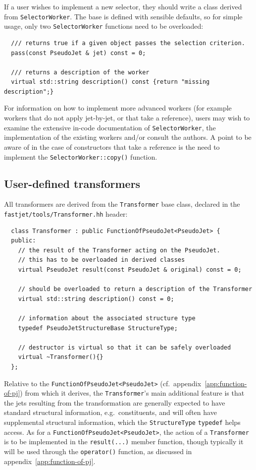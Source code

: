 \documentclass[12pt,a4]{article}
\newcommand{\ttt}[1]{{\small\texttt{#1}}}
\begin{document}
If a user wishes to implement a new selector, they should write a
class derived from \ttt{SelectorWorker}.
%
The base is defined with sensible defaults, so for simple usage, only
two \ttt{SelectorWorker} functions need to be overloaded:
\begin{lstlisting}
  /// returns true if a given object passes the selection criterion.
  pass(const PseudoJet & jet) const = 0;

  /// returns a description of the worker
  virtual std::string description() const {return "missing description";}
\end{lstlisting}
For information on how to implement more advanced workers (for example
workers that do not apply jet-by-jet, or that take a reference), users
may wish to examine the extensive in-code documentation of
\ttt{SelectorWorker}, the implementation of the existing workers
and/or consult the authors.
%
A point to be aware of in the case of constructors that take a
reference is the need to implement the \ttt{SelectorWorker::copy()}
function.

\subsection{User-defined transformers}
\label{sec:transformerdetails}



All transformers are derived from  the \ttt{Transformer} base class, 
declared in the \ttt{fastjet/tools/Transformer.hh} header:
\begin{lstlisting}
  class Transformer : public FunctionOfPseudoJet<PseudoJet> {
  public:
    // the result of the Transformer acting on the PseudoJet.
    // this has to be overloaded in derived classes
    virtual PseudoJet result(const PseudoJet & original) const = 0;
  
    // should be overloaded to return a description of the Transformer
    virtual std::string description() const = 0;
  
    // information about the associated structure type
    typedef PseudoJetStructureBase StructureType;

    // destructor is virtual so that it can be safely overloaded
    virtual ~Transformer(){}
  };
\end{lstlisting}
Relative to the \ttt{FunctionOfPseudoJet<PseudoJet>} (cf.\
appendix~\ref{app:function-of-pj}) from which it derives, the
\ttt{Transformer}'s main additional feature is that the jets resulting
from the transformation are generally expected to have standard
structural information, e.g.\ constituents, and will often have
supplemental structural information, which the \ttt{StructureType}
\ttt{typedef} helps access.
% 
As for a \ttt{FunctionOfPseudoJet<PseudoJet>}, the action of a
\ttt{Transformer} is to be implemented in the \ttt{result(...)} member
function,
%
though typically it will be used through the \ttt{operator()}
function, as discussed in appendix~\ref{app:function-of-pj}.
\end{document}
